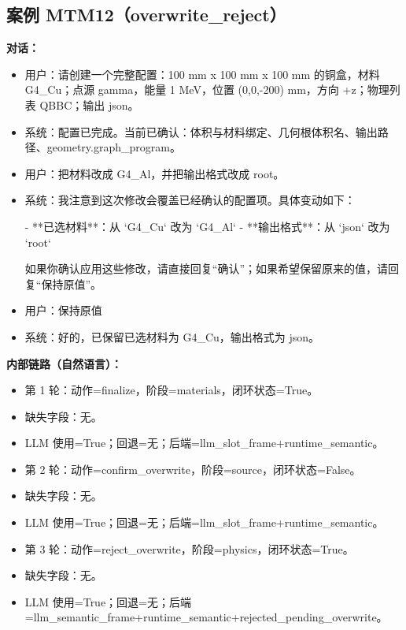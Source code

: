 \documentclass[11pt]{ctexart}
\begin{document}
\subsection{案例 MTM12（overwrite\_reject）}
\textbf{对话：}
\begin{itemize}
\item 用户：请创建一个完整配置：100 mm x 100 mm x 100 mm 的铜盒，材料 G4\_Cu；点源 gamma，能量 1 MeV，位置 (0,0,-200) mm，方向 +z；物理列表 QBBC；输出 json。
\item 系统：配置已完成。当前已确认：体积与材料绑定、几何根体积名、输出路径、geometry.graph\_program。
\item 用户：把材料改成 G4\_Al，并把输出格式改成 root。
\item 系统：我注意到这次修改会覆盖已经确认的配置项。具体变动如下：

- **已选材料**：从 `G4\_Cu` 改为 `G4\_Al`
- **输出格式**：从 `json` 改为 `root`

如果你确认应用这些修改，请直接回复“确认”；如果希望保留原来的值，请回复“保持原值”。
\item 用户：保持原值
\item 系统：好的，已保留已选材料为 G4\_Cu，输出格式为 json。
\end{itemize}
\textbf{内部链路（自然语言）：}
\begin{itemize}
\item 第 1 轮：动作=finalize，阶段=materials，闭环状态=True。
\item 缺失字段：无。
\item LLM 使用=True；回退=无；后端=llm\_slot\_frame+runtime\_semantic。
\item 第 2 轮：动作=confirm\_overwrite，阶段=source，闭环状态=False。
\item 缺失字段：无。
\item LLM 使用=True；回退=无；后端=llm\_slot\_frame+runtime\_semantic。
\item 第 3 轮：动作=reject\_overwrite，阶段=physics，闭环状态=True。
\item 缺失字段：无。
\item LLM 使用=True；回退=无；后端=llm\_semantic\_frame+runtime\_semantic+rejected\_pending\_overwrite。
\end{itemize}
\end{document}
